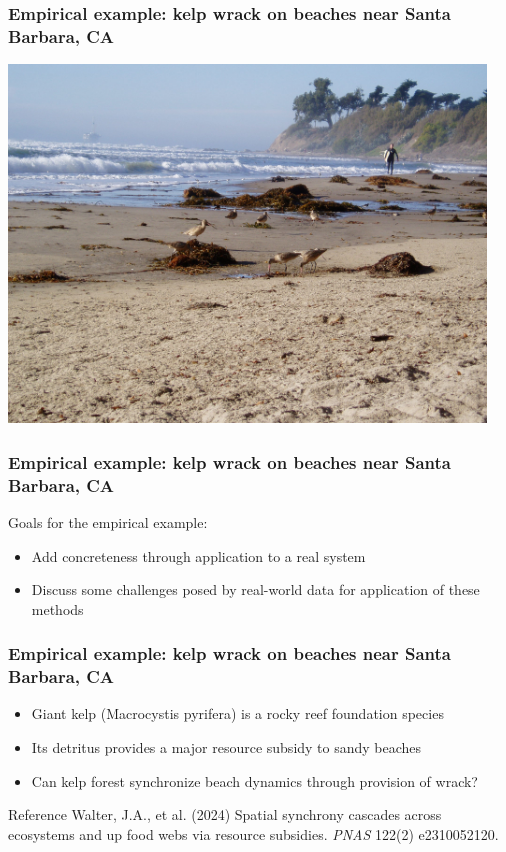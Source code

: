 \documentclass{beamer}
\begin{document}
\begin{frame}
\frametitle{Empirical example: kelp wrack on beaches near Santa Barbara, CA}
\includegraphics[width=0.95\textwidth]{../talk/figures/beachwrack.jpg}
\end{frame}

{
\begin{frame}
\frametitle{Empirical example: kelp wrack on beaches near Santa Barbara, CA}
Goals for the empirical example:
\begin{itemize}
\item Add concreteness through application to a real system
\item Discuss some challenges posed by real-world data for application of these methods
\end{itemize}
\end{frame}}

\begin{frame}
\frametitle{Empirical example: kelp wrack on beaches near Santa Barbara, CA}
\begin{itemize}
\item Giant kelp (Macrocystis pyrifera) is a rocky reef foundation species
\item Its detritus provides a major resource subsidy to sandy beaches
\item Can kelp forest synchronize beach dynamics through provision of wrack?
\end{itemize}
\begin{block}{Reference}
Walter, J.A., et al. (2024) Spatial synchrony cascades across ecosystems and up food webs via resource subsidies. \textit{PNAS} 122(2) e2310052120.
\end{block}
\end{frame}
\end{document}
